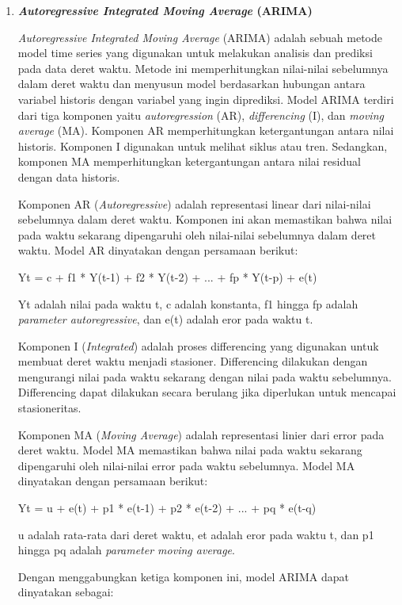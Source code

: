 \begin{enumerate}
    \item \textbf{\textit{Autoregressive Integrated Moving Average} (ARIMA)}
    
    \textit{Autoregressive Integrated Moving Average} (ARIMA) adalah sebuah metode model time series yang digunakan untuk melakukan analisis dan prediksi pada data deret waktu. Metode ini memperhitungkan nilai-nilai sebelumnya dalam deret waktu dan menyusun model berdasarkan hubungan antara variabel historis dengan variabel yang ingin diprediksi. Model ARIMA terdiri dari tiga komponen yaitu \textit{autoregression} (AR), \textit{differencing} (I), dan \textit{moving average} (MA). Komponen AR memperhitungkan ketergantungan antara nilai historis. Komponen I digunakan untuk melihat siklus atau tren. Sedangkan, komponen MA memperhitungkan ketergantungan antara nilai residual dengan data historis.

    Komponen AR (\textit{Autoregressive}) adalah representasi linear dari nilai-nilai sebelumnya dalam deret waktu. Komponen ini akan memastikan bahwa nilai pada waktu sekarang dipengaruhi oleh nilai-nilai sebelumnya dalam deret waktu. Model AR dinyatakan dengan persamaan berikut:

    Yt = c + f1 * Y(t-1) + f2 * Y(t-2) + ... + fp * Y(t-p) + e(t)

    Yt adalah nilai pada waktu t, c adalah konstanta, f1 hingga fp adalah \textit{parameter autoregressive}, dan e(t) adalah eror pada waktu t.

    Komponen I (\textit{Integrated}) adalah proses differencing yang digunakan untuk membuat deret waktu menjadi stasioner. Differencing dilakukan dengan mengurangi nilai pada waktu sekarang dengan nilai pada waktu sebelumnya. Differencing dapat dilakukan secara berulang jika diperlukan untuk mencapai stasioneritas.

    Komponen MA (\textit{Moving Average}) adalah representasi linier dari error pada deret waktu. Model MA memastikan bahwa nilai pada waktu sekarang dipengaruhi oleh nilai-nilai error pada waktu sebelumnya. Model MA dinyatakan dengan persamaan berikut:

    Yt = u + e(t) + p1 * e(t-1) + p2 * e(t-2) + ... + pq * e(t-q)
    
    u adalah rata-rata dari deret waktu, et adalah eror pada waktu t, dan p1 hingga pq adalah \textit{parameter moving average}.

    Dengan menggabungkan ketiga komponen ini, model ARIMA dapat dinyatakan sebagai:


\end{enumerate}
